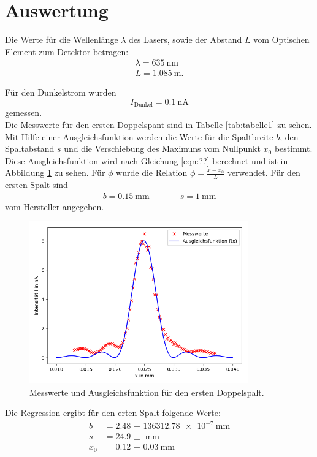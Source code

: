 \section{Auswertung}
\label{sec:Auswertung}
Die Werte für die Wellenlänge $\lambda$ des Lasers, sowie der Abstand $L$ vom Optischen Element zum
Detektor betragen:
\begin{align*}
  \lambda=\SI{635}{\nm}\\
  L=\SI{1,085}{\m}.
\end{align*}

Für den Dunkelstrom wurden
\begin{equation*}
   I_{\text{Dunkel}}=\SI{0.1}{\nA}
\end{equation*}
gemessen.\\

Die Messwerte für den ersten Doppelspant sind in Tabelle \ref{tab:tabelle1} zu sehen.
Mit Hilfe einer Ausgleichsfunktion werden die Werte für die Spaltbreite $b$, den
Spaltabstand $s$ und die Verschiebung des Maximuns vom Nullpunkt $x_{0}$ bestimmt.
Diese Ausgleichsfunktion wird nach Gleichung \ref{eqn:??} berechnet und ist in
Abbildung \ref{fig:plot1} zu sehen. Für $\phi$ wurde die Relation $\phi=\frac{x-x_{0}}{L}$
verwendet.
Für den ersten Spalt sind
\begin{align*}
  b=\SI{0,15}{\mm} &\;\;\;\;\;\;\;\;\;\; s=\SI{1}{\mm}
\end{align*}
vom Hersteller angegeben.


\begin{figure}
  \centering
  \includegraphics[height=7cm]{Figure_1.png}
  \caption{Messwerte und Ausgleichsfunktion für den ersten Doppelspalt.}
  \label{fig:plot1}
\end{figure}

Die Regression ergibt für den erten Spalt folgende Werte:
\begin{align*}
  b &=\SI{2.48(13631278)e-7}{\mm}\\
  s &=\SI{24.9(0)}{\mm}\\
  x_{0} &=\SI{0.12(3)}{\mm}
\end{align*}

